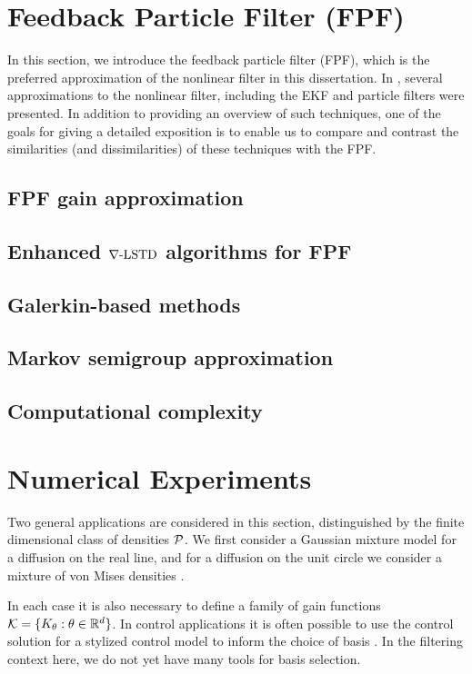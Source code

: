 \section{Feedback Particle Filter (FPF)}
\label{s:fpf}
In this section, we introduce the feedback particle filter (FPF), which is the preferred approximation of the nonlinear filter in this dissertation. In , several approximations to the nonlinear filter, including the EKF and particle filters were presented. In addition to providing an overview of such techniques, one of the goals for giving a detailed exposition is to enable us to compare and contrast the similarities (and dissimilarities) of these techniques with the FPF.  
\subsection{FPF gain approximation}
\subsection{Enhanced $\nabla\text{-LSTD}$ algorithms for FPF} 
\subsection{Galerkin-based methods}
\subsection{Markov semigroup approximation}
\subsection{Computational complexity}

\section{Numerical Experiments}
\label{s:fpf_numerics}

Two general applications are considered in this section, distinguished by the finite dimensional class of densities ${\cal P}$.  We first consider a Gaussian mixture model for a diffusion on the real line,  and for a diffusion on the unit circle we consider a mixture of von Mises densities \cite{haspea00}.

In each case it is also necessary to define a family of gain functions ${\cal K} = \{K_\theta : \theta\in\mathbb{R}^d\}$.  In control applications it is often possible to use the control solution for a stylized control model to inform the choice of basis  \cite{CTCN,huachemehmeysur11}.  In the filtering context here, we do not yet have many tools for basis selection.

